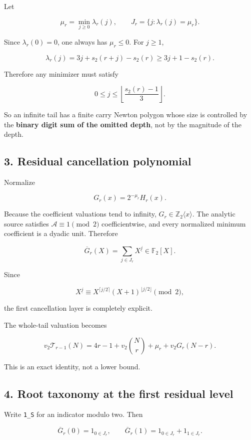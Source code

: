 \documentclass[11pt,letterpaper]{article}
\begin{document}
Let

\[
\mu_r=\min_{j\ge0}\lambda_r(j),
\qquad
J_r=\{j:\lambda_r(j)=\mu_r\}.
\]

Since \(\lambda_r(0)=0\), one always has \(\mu_r\le0\). For \(j\ge1\),

\[
\lambda_r(j)
=3j+s_2(r+j)-s_2(r)
\ge 3j+1-s_2(r).
\]

Therefore any minimizer must satisfy

\[
\boxed{
0\le j\le \left\lfloor\frac{s_2(r)-1}{3}\right\rfloor.
}
\]

So an infinite tail has a finite carry Newton polygon whose size is controlled by the \textbf{binary digit sum of the omitted depth}, not by the magnitude of the depth.

\subsection{3. Residual cancellation polynomial}\label{residual-cancellation-polynomial}

Normalize

\[
G_r(x)=2^{-\mu_r}H_r(x).
\]

Because the coefficient valuations tend to infinity, \(G_r\in\mathbb Z_2\langle x\rangle\). The analytic source satisfies \(\mathscr A\equiv1\pmod2\) coefficientwise, and every normalized minimum coefficient is a dyadic unit. Therefore

\[
\boxed{
\overline G_r(X)
=\sum_{j\in J_r}X^{\underline j}
\in\mathbb F_2[X].
}
\]

Since

\[
X^{\underline j}
\equiv
X^{\lceil j/2\rceil}(X+1)^{\lfloor j/2\rfloor}
\pmod2,
\]

the first cancellation layer is completely explicit.

The whole-tail valuation becomes

\[
\boxed{
 v_2\mathcal T_{r-1}(N)
 =4r-1+v_2\binom Nr+\mu_r+v_2G_r(N-r).
}
\]

This is an exact identity, not a lower bound.

\subsection{4. Root taxonomy at the first residual level}\label{root-taxonomy-at-the-first-residual-level}

Write \texttt{1\_S} for an indicator modulo two. Then

\[
\overline G_r(0)=1_{0\in J_r},
\qquad
\overline G_r(1)=1_{0\in J_r}+1_{1\in J_r}.
\]
\end{document}
